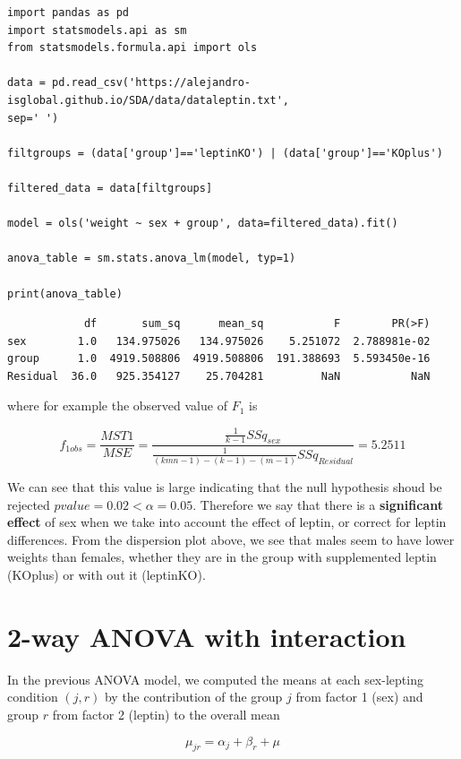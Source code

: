 \documentclass[
]{book}
\begin{document}
\begin{verbatim}
import pandas as pd
import statsmodels.api as sm
from statsmodels.formula.api import ols

data = pd.read_csv('https://alejandro-isglobal.github.io/SDA/data/dataleptin.txt', 
sep=' ')

filtgroups = (data['group']=='leptinKO') | (data['group']=='KOplus')

filtered_data = data[filtgroups]

model = ols('weight ~ sex + group', data=filtered_data).fit()

anova_table = sm.stats.anova_lm(model, typ=1)

print(anova_table)
\end{verbatim}

\begin{verbatim}
            df       sum_sq      mean_sq           F        PR(>F)
sex        1.0   134.975026   134.975026    5.251072  2.788981e-02
group      1.0  4919.508806  4919.508806  191.388693  5.593450e-16
Residual  36.0   925.354127    25.704281         NaN           NaN
\end{verbatim}

where for example the observed value of \(F_1\) is

\[f_{1obs}=\frac{MST1}{MSE}=\frac{\frac{1}{k-1}SSq_{sex}}{\frac{1}{(kmn-1)-(k-1)-(m-1)}SSq_{Residual}}=5.2511\]

We can see that this value is large indicating that the null hypothesis shoud be rejected \(pvalue=0.02<\alpha=0.05\). Therefore we say that there is a \textbf{significant effect} of sex when we take into account the effect of leptin, or correct for leptin differences. From the dispersion plot above, we see that males seem to have lower weights than females, whether they are in the group with supplemented leptin (KOplus) or with out it (leptinKO).

\hypertarget{way-anova-with-interaction}{%
\section{2-way ANOVA with interaction}\label{way-anova-with-interaction}}

In the previous ANOVA model, we computed the means at each sex-lepting condition \((j,r)\) by the contribution of the group \(j\) from factor 1 (sex) and group \(r\) from factor 2 (leptin) to the overall mean

\[\mu_{jr} = \alpha_{j} + \beta_{r} + \mu\]
\end{document}
